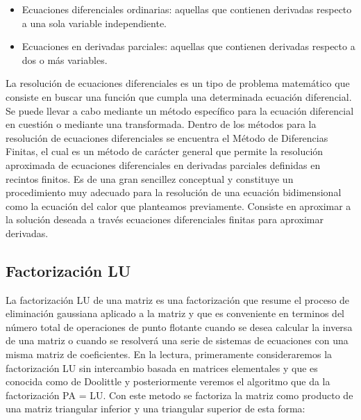 \documentclass[a4paper]{article}
\begin{document}
\begin{itemize}

\item Ecuaciones diferenciales ordinarias: aquellas que contienen derivadas respecto a una sola variable independiente. 
\item Ecuaciones en derivadas parciales: aquellas que contienen derivadas respecto a dos o más variables.

\end{itemize}

La resolución de ecuaciones diferenciales es un tipo de problema matemático que consiste en buscar una función que cumpla una determinada ecuación diferencial. Se puede llevar a cabo mediante un método específico para la ecuación diferencial en cuestión o mediante una transformada.
Dentro de los métodos para la resolución de ecuaciones diferenciales se encuentra el Método de Diferencias Finitas, el cual es un método de carácter general que permite la resolución aproximada de ecuaciones diferenciales en derivadas parciales definidas en recintos finitos. Es de una gran sencillez conceptual y constituye un procedimiento muy adecuado para la resolución de una ecuación bidimensional como la ecuación del calor que planteamos previamente.
Consiste en aproximar a la solución deseada a través ecuaciones diferenciales finitas para aproximar derivadas.

\subsection{Factorización LU}

La factorización LU de una matriz es una factorización que resume el proceso de eliminación gaussiana
aplicado a la matriz y que es conveniente en terminos del número total de operaciones de punto flotante cuando
se desea calcular la inversa de una matriz o cuando se resolverá una serie de sistemas de ecuaciones con una
misma matriz de coeficientes. En la lectura, primeramente consideraremos la factorización LU sin intercambio
basada en matrices elementales y que es conocida como de Doolittle y posteriormente veremos el algoritmo
que da la factorización PA = LU. Con este metodo se factoriza la matriz como producto de una matriz triangular inferior y una triangular superior de esta forma:
\end{document}

